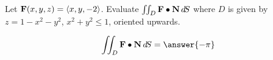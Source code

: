 \documentclass{ximera}
\author{David Guichard \and Neal Koblitz \and H. Jerome Keisler \and Albert Scheller \and Barry Balof \and Mike Wills \and Matthew Carr}
\begin{document}
\begin{exercise}




Let $\mathbf{F}(x,y,z)=\left\langle x,y,-2\right\rangle$. Evaluate $\iint_{D}\mathbf{F}\bullet\mathbf{N}\mathop{}\!d\! S$ where $D$ is given by $z=1-x^2-y^2$, $x^2+y^2\le 1$, oriented upwards.

\begin{prompt}
\[
\iint_{D}\vec{F}\dotp\vec{N}\d S=\answer{-\pi}
\]
\end{prompt}


\end{exercise}
\end{document}
